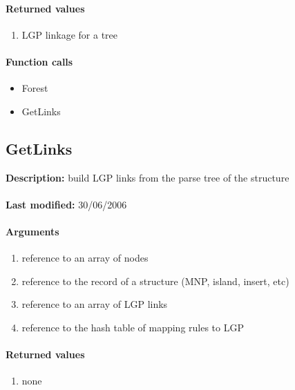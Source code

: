 \paragraph{Returned values}
\begin{enumerate}
\item LGP linkage for a tree
\end{enumerate}

\paragraph{Function calls}
\begin{itemize}
\item Forest
\item GetLinks
\end{itemize}

\subsection{GetLinks}
\textbf{Description:} build LGP links from the parse tree of the structure\\
\\\textbf{Last modified:} 30/06/2006

\paragraph{Arguments}
\begin{enumerate}
\item reference to an array of nodes
\item reference to the record of a structure (MNP, island, insert, etc)
\item reference to an array of LGP links
\item reference to the hash table of mapping rules to LGP
\end{enumerate}

\paragraph{Returned values}
\begin{enumerate}
\item none
\end{enumerate}


